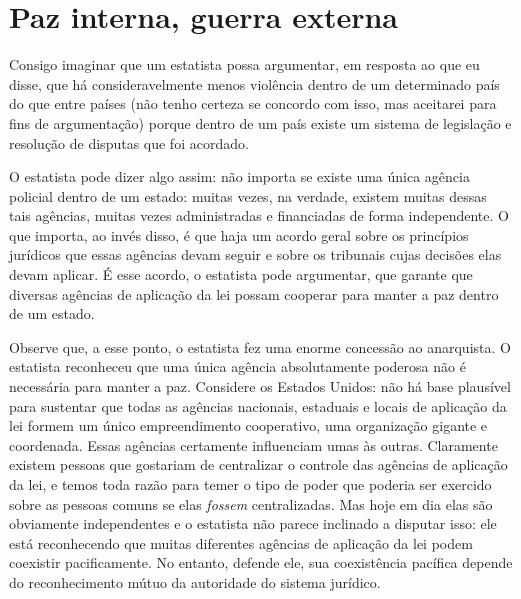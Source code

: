 \section{Paz interna, guerra externa}

Consigo imaginar que um estatista possa argumentar, em resposta ao que eu disse, que há consideravelmente menos violência dentro de um determinado país do que entre países (não tenho certeza se concordo com isso, mas aceitarei para fins de argumentação) porque dentro de um país existe um sistema de legislação e resolução de disputas que foi acordado.

O estatista pode dizer algo assim: não importa se existe uma única agência policial dentro de um estado: muitas vezes, na verdade, existem muitas dessas tais agências, muitas vezes administradas e financiadas de forma independente. O que importa, ao invés disso, é que haja um acordo geral sobre os princípios jurídicos que essas agências devam seguir e sobre os tribunais cujas decisões elas devam aplicar. É esse acordo, o estatista pode argumentar, que garante que diversas agências de aplicação da lei possam cooperar para manter a paz dentro de um estado.

Observe que, a esse ponto, o estatista fez uma enorme concessão ao anarquista. O estatista reconheceu que uma única agência absolutamente poderosa não é necessária para manter a paz. Considere os Estados Unidos: não há base plausível para sustentar que todas as agências nacionais, estaduais e locais de aplicação da lei formem um único empreendimento cooperativo, uma organização gigante e coordenada. Essas agências certamente influenciam umas às outras. Claramente existem pessoas que gostariam de centralizar o controle das agências de aplicação da lei, e temos toda razão para temer o tipo de poder que poderia ser exercido sobre as pessoas comuns se elas \emph{fossem} centralizadas. Mas hoje em dia elas são obviamente independentes e o estatista não parece inclinado a disputar isso: ele está reconhecendo que muitas diferentes agências de aplicação da lei podem coexistir pacificamente. No entanto, defende ele, sua coexistência pacífica depende do reconhecimento mútuo da autoridade do sistema jurídico.

